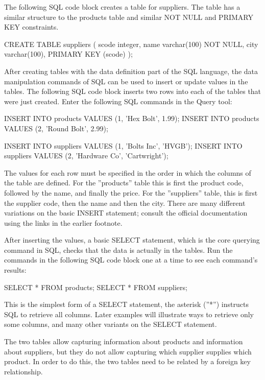 The following SQL code block creates a table for suppliers. The table has a similar structure to the products table and similar NOT NULL and PRIMARY KEY constraints.

\begin{sqlcode}
CREATE TABLE suppliers (
  scode integer,
  name  varchar(100) NOT NULL,
  city  varchar(100),
  PRIMARY KEY (scode) 
);
\end{sqlcode}

After creating tables with the data definition part of the SQL language, the data manipulation commands of SQL can be used to insert or update values in the tables. The following SQL code block inserts two rows into each of the tables that were just created. Enter the following SQL commands in the Query tool:

\begin{sqlcode}
INSERT INTO products VALUES (1, 'Hex Bolt', 1.99);
INSERT INTO products VALUES (2, 'Round Bolt', 2.99);

INSERT INTO suppliers VALUES (1, 'Bolts Inc', 'HVGB');
INSERT INTO suppliers VALUES (2, 'Hardware Co', 'Cartwright');
\end{sqlcode}

The values for each row must be specified in the order in which the columns of the table are defined. For the ''products'' table this is first the product code, followed by the name, and finally the price. For the ''suppliers'' table, this is first the supplier code, then the name and then the city. There are many different variations on the basic INSERT statement; consult the official documentation using the links in the earlier footnote.

After inserting the values, a basic SELECT statement, which is the core querying command in SQL, checks that the data is actually in the tables. Run the commands in the following SQL code block one at a time to see each command's results:

\begin{sqlcode}
SELECT * FROM products;
SELECT * FROM suppliers;
\end{sqlcode}

This is the simplest form of a SELECT statement, the asterisk (''*'') instructs SQL to retrieve all columns. Later examples will illustrate ways to retrieve only some columns, and many other variants on the SELECT statement.

The two tables allow capturing information about products and information about suppliers, but they do not allow capturing which supplier supplies which product. In order to do this, the two tables need to be related by a foreign key relationship. 

